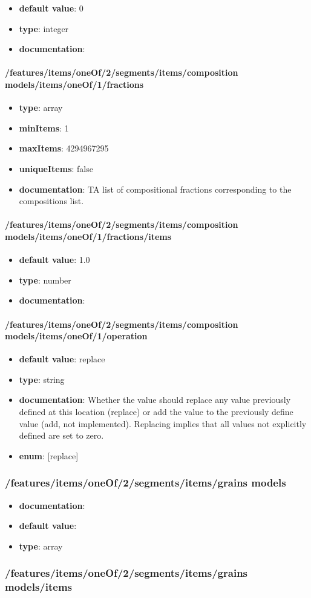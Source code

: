 \begin{itemize}\item {\bf default value}: 0
\item {\bf type}: integer
\item {\bf documentation}: 
\end{itemize}\paragraph{/features/items/oneOf/2/segments/items/composition models/items/oneOf/1/fractions}
\begin{itemize}\item {\bf type}: array
\item {\bf minItems}: 1
\item {\bf maxItems}: 4294967295
\item {\bf uniqueItems}: false
\item {\bf documentation}: TA list of compositional fractions corresponding to the compositions list.
\end{itemize}\paragraph{/features/items/oneOf/2/segments/items/composition models/items/oneOf/1/fractions/items}
\begin{itemize}\item {\bf default value}: 1.0
\item {\bf type}: number
\item {\bf documentation}: 
\end{itemize}\paragraph{/features/items/oneOf/2/segments/items/composition models/items/oneOf/1/operation}
\begin{itemize}\item {\bf default value}: replace
\item {\bf type}: string
\item {\bf documentation}: Whether the value should replace any value previously defined at this location (replace) or add the value to the previously define value (add, not implemented). Replacing implies that all values not explicitly defined are set to zero.
\item {\bf enum}: [replace]\end{itemize}\subsubsection{/features/items/oneOf/2/segments/items/grains models}
\begin{itemize}\item {\bf documentation}: 
\item {\bf default value}: 
\item {\bf type}: array
\end{itemize}\subsubsection{/features/items/oneOf/2/segments/items/grains models/items}

